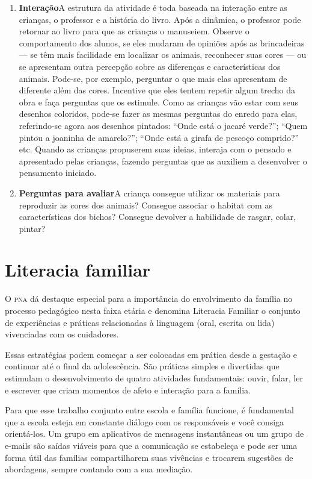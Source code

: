 \documentclass[11pt]{extarticle}
\begin{document}
\begin{enumerate}
\item \textbf{Interação}\quad A estrutura da atividade é toda baseada na interação entre as crianças, o professor e a história do livro. Após a dinâmica, o professor pode retornar ao livro para que as crianças o manuseiem. Observe o comportamento dos alunos, se eles mudaram de opiniões após as brincadeiras --- se têm mais facilidade em localizar os animais, reconhecer suas cores --- ou se apresentam outra percepção sobre as diferenças e características dos animais. Pode-se, por exemplo, perguntar o que mais elas apresentam de diferente além das cores.
 Incentive que eles tentem repetir algum trecho da obra e
faça perguntas que os estimule. Como as crianças vão estar com seus desenhos coloridos, pode-se fazer as mesmas perguntas do enredo para elas, referindo-se agora aos desenhos pintados: ``Onde está o jacaré verde?''; ``Quem pintou a joaninha de amarelo?''; ``Onde está a girafa de pescoço comprido?'' etc.
Quando as crianças propuserem suas ideias, interaja com o pensado e apresentado pelas crianças, fazendo perguntas que as auxiliem a desenvolver o pensamento iniciado.

\item \textbf{Perguntas para avaliar}\quad A criança consegue utilizar os materiais para reproduzir as cores dos animais? Consegue associar o habitat com as características dos bichos? Consegue devolver a habilidade de rasgar, colar, pintar?
\end{enumerate}


\section{Literacia familiar}
O \textsc{pna} dá destaque especial para a importância do envolvimento da família 
no processo pedagógico nesta faixa etária e denomina Literacia Familiar o conjunto 
de experiências e práticas relacionadas à linguagem (oral, escrita ou lida) vivenciadas 
com os cuidadores. 

Essas estratégias podem começar a ser colocadas em prática desde a 
gestação e continuar até o final da adolescência. São práticas simples e divertidas 
que estimulam o desenvolvimento de quatro atividades fundamentais: ouvir, falar, 
ler e escrever que criam momentos de afeto e interação para a família. 

Para que esse trabalho conjunto entre escola e família funcione, é 
fundamental que a escola esteja em constante diálogo com os responsáveis e 
você consiga orientá-los. Um grupo em aplicativos de mensagens instantâneas ou um 
grupo de e-mails são saídas viáveis para que a comunicação se estabeleça e pode ser 
uma forma útil das famílias compartilharem suas vivências e trocarem sugestões 
de abordagens, sempre contando com a sua mediação. 
\end{document}
